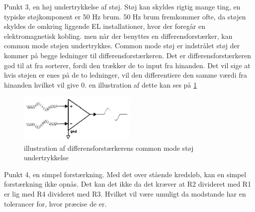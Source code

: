 Punkt 3, en høj undertrykkelse af støj. Støj kan skyldes rigtig mange ting, en typiske støjkomponent er 50 Hz brum. 50 Hz brum fremkommer ofte, da støjen skyldes de omkring liggende EL installationer, hvor der foregår en elektromagnetisk kobling. men når der benyttes en differensforstærker, kan common mode støjen undertrykkes. Common mode støj er indstrålet støj der kommer på begge ledninger til differensforstærkeren. Det er differensforstærkeren god til at fra sorterer, fordi den trækker de to input fra hinanden. Det vil sige at hvis støjen er enes på de to ledninger, vil den differentiere den samme værdi fra hinanden hvilket vil give 0. en illustration af dette kan ses på \ref{fig:differensNoise} 
\begin{figure}[H]
	\centering
	\includegraphics[width=0.5\textwidth]{billeder/Hardware/differensnoise.jpg}
	\caption{illustration af differensforstærkerens common mode støj undertrykkelse}
	\label{fig:differensNoise}
\end{figure}

Punkt 4, en simpel forstærkning. Med det over stående kredsløb, kan en simpel forstærkning ikke opnås. Det kan det ikke da det kræver at R2 divideret med R1 er lig med R4 divideret med R3. Hvilket vil være umuligt da modstande har en tolerancer for, hvor præcise de er.

